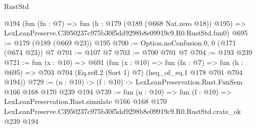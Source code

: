 \begin{lexlean}{RustStd}
\begin{coremodule}
    @194
    (fun (fn : @7) =>
    fun (h : @179 (@189 (@668 Nat.zero @18)) @195) =>
    LexLeanPreserve.C3950237c975b30f5dd9298b8e09919c9.R0.RustStd.fun0)
@695 := @179 (@189 (@669 @23)) @195
@700 := Option.noConfusion.{0, 0} (@171 (@674 @23)) @7
@701 := @107 @7
@703 := @700 @701 @7
@704 := @193 @239
@721 := fun (x : @10) =>
  @691
    (fun (x : @10) =>
    fun (fn : @7) =>
    fun (h : @695) => @703 @704 (Eq.refl.{2} (Sort 1) @7) (heq_of_eq.{1} @178 @701 @704 @194))
@729 := (n : @10) -> (f : @10) -> LexLeanPreservation.Rust.FunSem @166 @168 @170 @239 @194
@739 := fun (n : @10) =>
  fun (f : @10) =>
  LexLeanPreservation.Rust.simulate
    @166
    @168
    @170
    LexLeanPreserve.C3950237c975b30f5dd9298b8e09919c9.R0.RustStd.crate_ok
    @239
    @194
\end{coremodule}
\end{lexlean}
